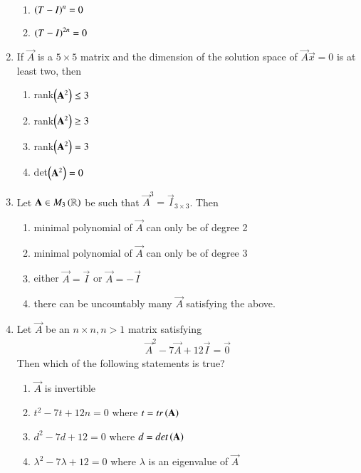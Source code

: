 \begin{enumerate}[label=\thesection.\arabic*.,ref=\thesection.\theenumi]
\begin{enumerate}
\item $\left(T-I\right)^{n} = 0$ 
\item $\left(T-I\right)^{2n} = 0$ 
\end{enumerate}
%
\item If $\vec{A}$ is a $5\times 5$ matrix and the dimension of the solution space of $\vec{A}\vec{x} = 0$ is at least two, then
\begin{enumerate}
\item rank$\left(\mathbf{A}^2\right) \le 3$ 
\item rank$\left(\mathbf{A}^2\right) \ge 3$ 
\item rank$\left(\mathbf{A}^2\right) = 3$ 
\item det$\left(\mathbf{A}^2\right) = 0$ 
\end{enumerate}
%
\item Let $\mathbf{A} \in M_3\left(\mathbb{R}\right)$ be such that $\vec{A}^3 = \vec{I}_{3\times 3}$.  Then
\begin{enumerate}
\item minimal polynomial of $\vec{A}$ can only be of degree 2
\item minimal polynomial of $\vec{A}$ can only be of degree 3
\item either $\vec{A} = \vec{I}$ or $\vec{A} = -\vec{I}$
\item there can be uncountably many $\vec{A}$ satisfying the above.
\end{enumerate}
%
\item Let $\vec{A}$ be an $n \times n, n > 1$ matrix satisfying
\begin{align}
\vec{A}^2 - 7\vec{A} + 12\vec{I} = \vec{0}
\end{align}
%
Then which of the following statements is true?
\begin{enumerate}
\item  $\vec{A}$ is invertible
\item $t^2-7t+12n = 0$ where $t = tr\left(\mathbf{A}\right)$
\item $d^2-7d+12 = 0$ where $d = det\left(\mathbf{A}\right)$
\item $\lambda^2-7\lambda+12 = 0$ where $\lambda$ is an eigenvalue of $\vec{A}$
\end{enumerate}
\end{enumerate}
